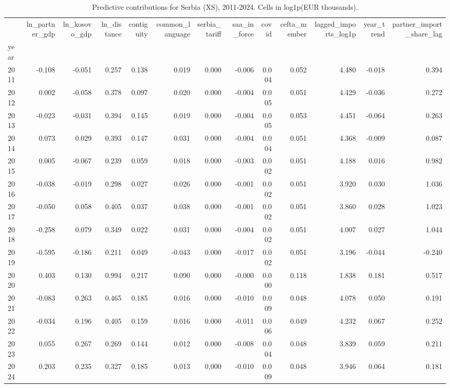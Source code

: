 \begin{table}
\caption{Predictive contributions for Serbia (XS), 2011-2024. Cells in log1p(EUR thousands).}
\label{tbl:ch4-serbia-shap}
\begin{tabular}{lrrrrrrrrrrrr}
\toprule
 & ln\_partner\_gdp & ln\_kosovo\_gdp & ln\_distance & contiguity & common\_language & serbia\_tariff & saa\_in\_force & covid & cefta\_member & lagged\_imports\_log1p & year\_trend & partner\_import\_share\_lag \\
year &  &  &  &  &  &  &  &  &  &  &  &  \\
\midrule
2011 & -0.108 & -0.051 & 0.257 & 0.138 & 0.019 & 0.000 & -0.006 & 0.004 & 0.052 & 4.480 & -0.018 & 0.394 \\
2012 & 0.002 & -0.058 & 0.378 & 0.097 & 0.020 & 0.000 & -0.004 & 0.005 & 0.051 & 4.429 & -0.036 & 0.272 \\
2013 & -0.023 & -0.031 & 0.394 & 0.145 & 0.019 & 0.000 & -0.004 & 0.005 & 0.053 & 4.451 & -0.064 & 0.263 \\
2014 & 0.073 & 0.029 & 0.393 & 0.147 & 0.031 & 0.000 & -0.004 & 0.004 & 0.051 & 4.368 & -0.009 & 0.087 \\
2015 & 0.005 & -0.067 & 0.239 & 0.059 & 0.018 & 0.000 & -0.003 & 0.002 & 0.051 & 4.188 & 0.016 & 0.982 \\
2016 & -0.038 & -0.019 & 0.298 & 0.027 & 0.026 & 0.000 & -0.001 & 0.002 & 0.051 & 3.920 & 0.030 & 1.036 \\
2017 & -0.050 & 0.058 & 0.405 & 0.037 & 0.038 & 0.000 & -0.001 & 0.002 & 0.051 & 3.860 & 0.028 & 1.023 \\
2018 & -0.258 & 0.079 & 0.349 & 0.022 & 0.031 & 0.000 & -0.004 & 0.002 & 0.051 & 4.007 & 0.027 & 1.044 \\
2019 & -0.595 & -0.186 & 0.211 & 0.049 & -0.043 & 0.000 & -0.017 & 0.002 & 0.051 & 3.196 & -0.044 & -0.240 \\
2020 & 0.403 & 0.130 & 0.994 & 0.217 & 0.090 & 0.000 & -0.000 & 0.000 & 0.118 & 1.838 & 0.181 & 0.517 \\
2021 & -0.083 & 0.263 & 0.465 & 0.185 & 0.016 & 0.000 & -0.010 & 0.009 & 0.048 & 4.078 & 0.050 & 0.191 \\
2022 & -0.034 & 0.196 & 0.405 & 0.159 & 0.016 & 0.000 & -0.011 & 0.006 & 0.049 & 4.232 & 0.067 & 0.252 \\
2023 & 0.055 & 0.267 & 0.269 & 0.144 & 0.012 & 0.000 & -0.008 & 0.004 & 0.048 & 3.839 & 0.059 & 0.211 \\
2024 & 0.203 & 0.235 & 0.327 & 0.185 & 0.013 & 0.000 & -0.010 & 0.009 & 0.048 & 3.946 & 0.064 & 0.181 \\
\bottomrule
\end{tabular}
\end{table}
